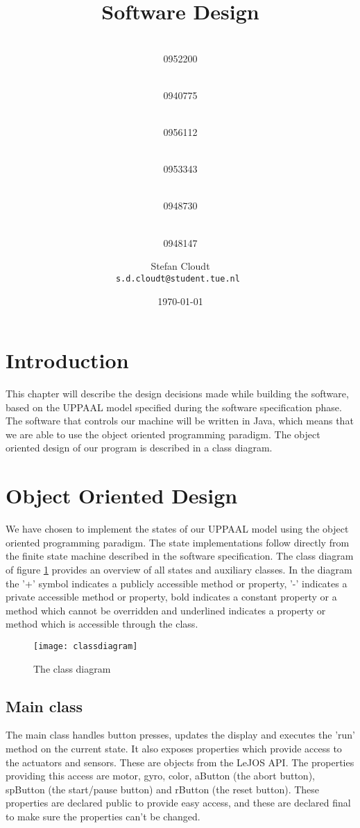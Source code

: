 \documentclass[a4paper,oneside,11pt]{article}
\title{\vspace{-\baselineskip}\sffamily\bfseries Software Design}
\author{
	\makebox[.25\linewidth]{Sergio van Amerongen}\\0952200 \and
	\makebox[.25\linewidth]{Stefan Cloudt}\\0940775 \and
	\makebox[.25\linewidth]{Daan de Graaf}\\0956112 \and
	\makebox[.25\linewidth]{Robert van Lente}\\0953343 \and
	\makebox[.25\linewidth]{Tom Peters}\\0948730 \and
	\makebox[.25\linewidth]{Berrie Trippe}\\0948147 
	\and \makebox[.75\linewidth]{\textbf{Responsible:}} \and
	Stefan Cloudt\\ \tt{s.d.cloudt@student.tue.nl}
}
\date{\today}
\begin{document}
\maketitle
\section{Introduction}
This chapter will describe the design decisions made while building the software, based on the UPPAAL model specified during the software specification phase. The software that controls our machine will be written in Java, which means that we are able to use the object oriented programming paradigm. The object oriented design of our program is described in a class diagram.

\section{Object Oriented Design}
We have chosen to implement the states of our UPPAAL model using the object oriented programming paradigm. The state implementations follow directly from the finite state machine described in the software specification. The class diagram of figure \ref{classdiagram} provides an overview of all states and auxiliary classes. In the diagram the '+' symbol indicates a publicly accessible method or property, '-' indicates a private accessible method or property, bold indicates a constant property or a method which cannot be overridden and underlined indicates a property or method which is accessible through the class.

\begin{figure}[ht!]
\centering
\texttt{[image: classdiagram]}
\caption{\label{classdiagram}The class diagram}
\end{figure}

\newpage
\subsection{Main class}
The main class handles button presses, updates the display and executes the 'run' method on the current state. It also exposes properties which provide access to the actuators and sensors. These are objects from the LeJOS API. The properties providing this access are motor, gyro, color, aButton (the abort button), spButton (the start/pause button) and rButton (the reset button). These properties are declared public to provide easy access, and these are declared final to make sure the properties can’t be changed.
\end{document}
